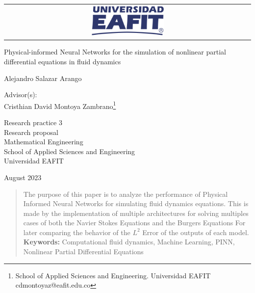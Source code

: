 \documentclass[12pt,letterpaper]{article}
\begin{document}
\begin{titlepage}

\Large
\sffamily

\begin{center}
  \begin{tabular}{c}
    \includegraphics[width=0.30\textwidth]{logo-eafit.png}
  \end{tabular}
\end{center}

\vfill
\begin{center}
  \LARGE Physical-informed Neural Networks for the simulation of nonlinear partial differential equations in fluid dynamics
\end{center}

\vspace*{1cm}
\centerline{\LARGE Alejandro Salazar Arango\footnotemark}  
\vfill

\begin{center}
Advisor(s): \\
Cristhian David Montoya Zambrano\footnote{School of Applied Sciences and Engineering. Universidad EAFIT cdmontoyaz@eafit.edu.co}   \\
\end{center}

\vfill

\begin{center}
  \large
    Research practice 3 \\
  Research proposal \\
  Mathematical Engineering\\
  School of Applied Sciences and Engineering\\
  Universidad EAFIT \\
\end{center}

\vfill
\centerline{August 2023}
\vspace*{0.7cm}
\end{titlepage}


\begin{abstract}
    
  The purpose of this paper is to analyze the performance of Physical Informed Neural Networks for simulating fluid dynamics equations. This is made by the implementation of multiple architectures for solving multiples cases of both the Navier Stokes Equations and the Burgers Equations For later comparing the behavior of the $L^2$ Error of the outputs of each model.\\
  
    \noindent \textbf{Keywords:} Computational fluid dynamics, Machine Learning, PINN, Nonlinear Partial Differential Equations
    \end{abstract}
\end{document}
